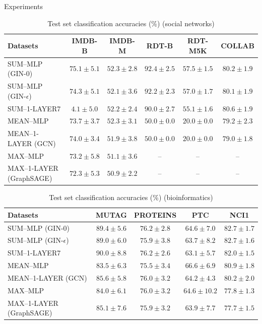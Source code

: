 \documentclass{beamer}
\theoremstyle{definition}
\begin{document}
\begin{frame}{Experiments}
    \begin{tiny}
    \begin{table}
      \caption{Test set classification accuracies (\%) (social networks)}
      \label{table:3}
      \begin{tabular}{ l c c c c c }
        \hline
        Datasets & IMDB-B & IMDB-M & RDT-B & RDT-M5K & COLLAB \\
        \hline
        SUM–MLP (GIN-\(0\)) & $75.1\pm5.1$ & $52.3\pm2.8$ & $92.4\pm2.5$ & $57.5\pm1.5$ & $80.2\pm1.9$ \\
        SUM–MLP (GIN-\(\epsilon\)) & $74.3\pm5.1$ & $52.1\pm3.6$ & $92.2\pm2.3$ & $57.0\pm1.7$ & $80.1\pm1.9$ \\
        SUM–1-LAYER7 & $4.1\pm5.0$ & $52.2\pm2.4$ & $90.0\pm2.7$ & $55.1\pm1.6$ & $80.6\pm1.9$ \\
        MEAN–MLP & $73.7\pm3.7$ & $52.3\pm3.1$ & $50.0\pm0.0$ & $20.0\pm0.0$ & $79.2\pm2.3$ \\
        MEAN–1-LAYER (GCN) & $74.0\pm3.4$ & $51.9\pm3.8$ & $50.0\pm0.0$ & $20.0\pm0.0$ & $79.0\pm1.8$ \\
        MAX–MLP & $73.2\pm5.8$ & $51.1\pm3.6$ & – & – & – \\
        MAX–1-LAYER (GraphSAGE) & $72.3\pm5.3$ & $50.9\pm2.2$ & – & – & – \\
        \hline
      \end{tabular}
    \end{table}
    
    \begin{table}
      \caption{Test set classification accuracies (\%) (bioinformatics)}
      \label{table:4}
      \begin{tabular}{ l c c c c }
        \hline
        Datasets & MUTAG & PROTEINS & PTC & NCI1 \\
        \hline
        SUM–MLP (GIN-\(0\)) & $89.4\pm5.6$ & $76.2\pm2.8$ & $64.6\pm7.0$ & $82.7\pm1.7$ \\
        SUM–MLP (GIN-\(\epsilon\)) & $89.0\pm6.0$ & $75.9\pm3.8$ & $63.7\pm8.2$ & $82.7\pm1.6$ \\
        SUM–1-LAYER7 & $90.0\pm8.8$ & $76.2\pm2.6$ & $63.1\pm5.7$ & $82.0\pm1.5$ \\
        MEAN–MLP & $83.5\pm6.3$ & $75.5\pm3.4$ & $66.6\pm6.9$ & $80.9\pm1.8$ \\
        MEAN–1-LAYER (GCN) & $85.6\pm5.8$ & $76.0\pm3.2$ & $64.2\pm4.3$ & $80.2\pm2.0$ \\
        MAX–MLP & $84.0\pm6.1$ & $76.0\pm3.2$ & $64.6\pm10.2$ & $77.8\pm1.3$ \\
        MAX–1-LAYER (GraphSAGE) & $85.1\pm7.6$ & $75.9\pm3.2$ & $63.9\pm7.7$ & $77.7\pm1.5$ \\
        \hline
      \end{tabular}
    \end{table}
    \end{tiny}
\end{frame}
\end{document}
